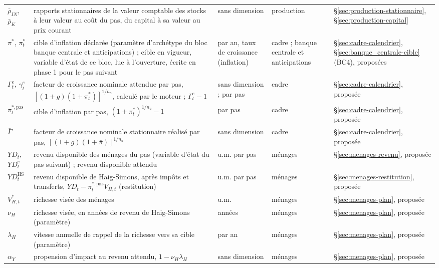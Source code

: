 \documentclass[11pt,a4paper]{article}
\begin{document}
\begin{center}
\begin{longtable}{>{\raggedright\arraybackslash}p{1.6cm}>{\raggedright\arraybackslash}p{5.6cm}>{\raggedright\arraybackslash}p{2.0cm}>{\raggedright\arraybackslash}p{2.2cm}>{\raggedright\arraybackslash}p{2.8cm}}
$\bar\rho_{\mathit{IN}}$, $\bar\rho_K$ & rapports stationnaires de la valeur comptable des stocks à leur valeur au coût du pas, du capital à sa valeur au prix courant & sans dimension & production & \S\ref{sec:production-stationnaire}, \S\ref{sec:production-capital}\\
$\pi^\ast$, $\pi^\ast_t$ & cible d'inflation déclarée (paramètre d'archétype du bloc banque centrale et anticipations) ; cible en vigueur, variable d'état de ce bloc, lue à l'ouverture, écrite en phase 1 pour le pas suivant & par an, taux de croissance (inflation) & cadre ; banque centrale et anticipations & \S\ref{sec:cadre-calendrier}, \S\ref{sec:banque_centrale-cible} (BC4), proposées\\
$\Gamma^e_t$, $\gamma^e_t$ & facteur de croissance nominale attendue par pas, $[(1 + g)(1 + \pi^\ast_t)]^{1/n_a}$, calculé par le moteur ; $\Gamma^e_t - 1$ & sans dimension ; par pas & cadre & \S\ref{sec:cadre-calendrier}, proposée\\
$\pi^{\ast,\mathrm{pas}}_t$ & cible d'inflation par pas, $(1 + \pi^\ast_t)^{1/n_a} - 1$ & par pas & cadre & \S\ref{sec:cadre-calendrier}, proposée\\
$\bar\Gamma$ & facteur de croissance nominale stationnaire réalisé par pas, $[(1 + g)(1 + \bar\pi)]^{1/n_a}$ & sans dimension & cadre & \S\ref{sec:cadre-calendrier}, proposée\\
$\mathit{YD}_t$, $\mathit{YD}^e_t$ & revenu disponible des ménages du pas (variable d'état du pas suivant) ; revenu disponible attendu & u.m. par pas & ménages & \S\ref{sec:menages-revenu}, proposée\\
$\mathit{YD}^{\mathrm{HS}}_t$ & revenu disponible de Haig-Simons, après impôts et transferts, $\mathit{YD}_t - \pi^{\ast,\mathrm{pas}}_t V_{H,t}$ (restitution) & u.m. par pas & ménages & \S\ref{sec:menages-restitution}, proposée\\
$V^\ast_{H,t}$ & richesse visée des ménages & u.m. & ménages & \S\ref{sec:menages-plan}, proposée\\
$\nu_H$ & richesse visée, en années de revenu de Haig-Simons (paramètre) & années & ménages & \S\ref{sec:menages-plan}, proposée\\
$\lambda_H$ & vitesse annuelle de rappel de la richesse vers sa cible (paramètre) & par an & ménages & \S\ref{sec:menages-plan}, proposée\\
$\alpha_Y$ & propension d'impact au revenu attendu, $1 - \nu_H\lambda_H$ & sans dimension & ménages & \S\ref{sec:menages-plan}, proposée\\

\end{longtable}
\end{center}
\end{document}
